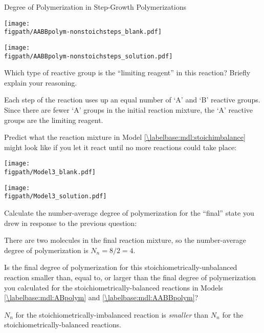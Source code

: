\begin{activity}{Degree of Polymerization in Step-Growth Polymerizations}
\begin{ctqs}
			\begin{solution}[1in]{\centerline{\texttt{[image: \\figpath/AABBpolym-nonstoichsteps\_blank.pdf]}}}
				\centerline{\texttt{[image: \\figpath/AABBpolym-nonstoichsteps\_solution.pdf]}}
			\end{solution}
		
		\clearpage
		\question Which type of reactive group is the ``limiting reagent'' in this reaction?  Briefly explain your reasoning.
		
			\begin{solution}[1in]{}
				Each step of the reaction uses up an equal number of `A' and `B' reactive groups. Since there are fewer `A' groups in the initial reaction mixture, the `A' reactive groups are the limiting reagent.
			\end{solution}
		
		\question \label{\labelbase:ctq:nonstoichpredict} Predict what the reaction mixture in Model \ref{\labelbase:mdl:stoichimbalance} might look like if you let it react until no more reactions could take place:
		
\begin{solution}[2in]{\centerline{\texttt{[image: \\figpath/Model3\_blank.pdf]}}}
	\centerline{\texttt{[image: \\figpath/Model3\_solution.pdf]}}
\end{solution}
		
		\question Calculate the number-average degree of polymerization for the ``final'' state you drew in response to the previous question:
		
		\begin{solution}[1in]{}
			There are two molecules in the final reaction mixture, so the number-average degree of polymerization is $N_n = 8/2 = 4$.
		\end{solution}
		
		\question Is the final degree of polymerization for this stoichiometrically-unbalanced reaction smaller than, equal to, or larger than the final degree of polymerization you calculated for the stoichiometrically-balanced reactions in Models \ref{\labelbase:mdl:ABpolym} and \ref{\labelbase:mdl:AABBpolym}?
		
		\begin{solution}[1in]{}
			$N_n$ for the stoichiometrically-imbalanced reaction is \emph{smaller} than $N_n$ for the stoichiometrically-balanced reactions.
		\end{solution}
		

\end{ctqs}
\end{activity}
